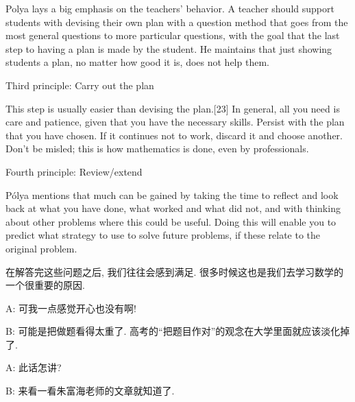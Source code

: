 \begin{pas}
Polya lays a big emphasis on the teachers' behavior. A teacher should support students with devising their own plan with a question method that goes from the most general questions to more particular questions, with the goal that the last step to having a plan is made by the student. He maintains that just showing students a plan, no matter how good it is, does not help them.

Third principle: Carry out the plan

This step is usually easier than devising the plan.[23] In general, all you need is care and patience, given that you have the necessary skills. Persist with the plan that you have chosen. If it continues not to work, discard it and choose another. Don't be misled; this is how mathematics is done, even by professionals.

Fourth principle: Review/extend

Pólya mentions that much can be gained by taking the time to reflect and look back at what you have done, what worked and what did not, and with thinking about other problems where this could be useful. Doing this will enable you to predict what strategy to use to solve future problems, if these relate to the original problem.


\end{pas}

在解答完这些问题之后, 我们往往会感到满足. 很多时候这也是我们去学习数学的一个很重要的原因. 

\begin{dialogue}
A: 可我一点感觉开心也没有啊! 

B: 可能是把做题看得太重了. 高考的``把题目作对''的观念在大学里面就应该淡化掉了. 

A: 此话怎讲?

B: 来看一看朱富海老师的文章就知道了. 

\end{dialogue}

